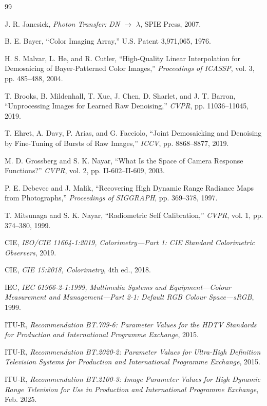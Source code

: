 \documentclass[12pt,openany,oneside]{book}
\begin{document}
\begin{thebibliography}{99}
\begin{LTR}
J. R. Janesick,
\emph{Photon Transfer: DN $\to$ $\lambda$}, SPIE Press, 2007.

B. E. Bayer,
``Color Imaging Array,'' U.S. Patent 3,971,065, 1976.

H. S. Malvar, L. He, and R. Cutler,
``High-Quality Linear Interpolation for Demosaicing of Bayer-Patterned Color Images,''
\emph{Proceedings of ICASSP}, vol. 3, pp. 485--488, 2004.

T. Brooks, B. Mildenhall, T. Xue, J. Chen, D. Sharlet, and J. T. Barron,
``Unprocessing Images for Learned Raw Denoising,''
\emph{CVPR}, pp. 11036--11045, 2019.

T. Ehret, A. Davy, P. Arias, and G. Facciolo,
``Joint Demosaicking and Denoising by Fine-Tuning of Bursts of Raw Images,''
\emph{ICCV}, pp. 8868--8877, 2019.

M. D. Grossberg and S. K. Nayar,
``What Is the Space of Camera Response Functions?''
\emph{CVPR}, vol. 2, pp. II-602--II-609, 2003.

P. E. Debevec and J. Malik,
``Recovering High Dynamic Range Radiance Maps from Photographs,''
\emph{Proceedings of SIGGRAPH}, pp. 369--378, 1997.

T. Mitsunaga and S. K. Nayar,
``Radiometric Self Calibration,''
\emph{CVPR}, vol. 1, pp. 374--380, 1999.

CIE,
\emph{ISO/CIE 11664-1:2019, Colorimetry---Part 1: CIE Standard Colorimetric Observers}, 2019.

CIE,
\emph{CIE 15:2018, Colorimetry}, 4th ed., 2018.

IEC,
\emph{IEC 61966-2-1:1999, Multimedia Systems and Equipment---Colour Measurement and Management---Part 2-1: Default RGB Colour Space---sRGB}, 1999.

ITU-R,
\emph{Recommendation BT.709-6: Parameter Values for the HDTV Standards for Production and International Programme Exchange}, 2015.

ITU-R,
\emph{Recommendation BT.2020-2: Parameter Values for Ultra-High Definition Television Systems for Production and International Programme Exchange}, 2015.

ITU-R,
\emph{Recommendation BT.2100-3: Image Parameter Values for High Dynamic Range Television for Use in Production and International Programme Exchange}, Feb. 2025.


\end{LTR}
\end{thebibliography}
\end{document}
